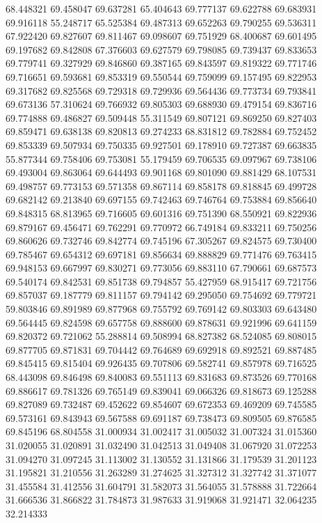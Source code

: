 68.448321
69.458047
69.637281
65.404643
69.777137
69.622788
69.683931
69.916118
55.248717
65.525384
69.487313
69.652263
69.790255
69.536311
67.922420
69.827607
69.811467
69.098607
69.751929
68.400687
69.601495
69.197682
69.842808
67.376603
69.627579
69.798085
69.739437
69.833653
69.779741
69.327929
69.846860
69.387165
69.843597
69.819322
69.771746
69.716651
69.593681
69.853319
69.550544
69.759099
69.157495
69.822953
69.317682
69.825568
69.729318
69.729936
69.564436
69.773734
69.793841
69.673136
57.310624
69.766932
69.805303
69.688930
69.479154
69.836716
69.774888
69.486827
69.509448
55.311549
69.807121
69.869250
69.827403
69.859471
69.638138
69.820813
69.274233
68.831812
69.782884
69.752452
69.853339
69.507934
69.750335
69.927501
69.178910
69.727387
69.663835
55.877344
69.758406
69.753081
55.179459
69.706535
69.097967
69.738106
69.493004
69.863064
69.644493
69.901168
69.801090
69.881429
68.107531
69.498757
69.773153
69.571358
69.867114
69.858178
69.818845
69.499728
69.682142
69.213840
69.697155
69.742463
69.746764
69.753884
69.856640
69.848315
68.813965
69.716605
69.601316
69.751390
68.550921
69.822936
69.879167
69.456471
69.762291
69.770972
66.749184
69.833211
69.750256
69.860626
69.732746
69.842774
69.745196
67.305267
69.824575
69.730400
69.785467
69.654312
69.697181
69.856634
69.888829
69.771476
69.763415
69.948153
69.667997
69.830271
69.773056
69.883110
67.790661
69.687573
69.540174
69.842531
69.851738
69.794857
55.427959
68.915417
69.721756
69.857037
69.187779
69.811157
69.794142
69.295050
69.754692
69.779721
59.803846
69.891989
69.877968
69.755792
69.769142
69.803303
69.643480
69.564445
69.824598
69.657758
69.888600
69.878631
69.921996
69.641159
69.820372
69.721062
55.288814
69.508994
68.827382
68.524085
69.808015
69.877705
69.871831
69.704442
69.764689
69.692918
69.892521
69.887485
69.845415
69.815404
69.926435
69.707806
69.582741
69.857978
69.716525
68.443098
69.846498
69.840083
69.551113
69.831683
69.873526
69.770168
69.886617
69.781326
69.765149
69.839041
69.066326
69.818673
69.125288
69.827089
69.732487
69.452622
69.854607
69.672353
69.469209
69.745585
69.573161
69.843943
69.567588
69.691187
69.738473
69.809505
69.876585
69.845196
68.804558
31.000934
31.002417
31.005032
31.007324
31.015360
31.020055
31.020891
31.032490
31.042513
31.049408
31.067920
31.072253
31.094270
31.097245
31.113002
31.130552
31.131866
31.179539
31.201123
31.195821
31.210556
31.263289
31.274625
31.327312
31.327742
31.371077
31.455584
31.412556
31.604791
31.582073
31.564055
31.578888
31.722664
31.666536
31.866822
31.784873
31.987633
31.919068
31.921471
32.064235
32.214333

